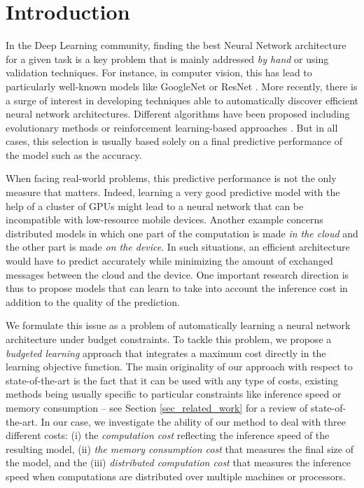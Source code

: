 \documentclass[10pt,twocolumn,letterpaper]{article}
\begin{document}
\section{Introduction}

In the Deep Learning community, finding the best Neural Network architecture for a given task is a key problem that is mainly addressed \textit{by hand} or using validation techniques. For instance, in computer vision, this has lead to particularly well-known models like GoogleNet \cite{DBLP:journals/corr/SzegedyLJSRAEVR14} or ResNet \cite{DBLP:journals/corr/HeZRS15}. More recently, there is a surge of interest in developing techniques able to automatically discover efficient neural network architectures. Different algorithms have been proposed including evolutionary methods \cite{DBLP:conf/gecco/StanleyM02a, DBLP:journals/corr/MiikkulainenLMR17, DBLP:journals/corr/RealMSSSLK17} or reinforcement learning-based approaches \cite{DBLP:journals/corr/ZophL16}. But in all cases, this selection is usually based solely on a final predictive performance of the model such as the accuracy. 

When facing real-world problems, this predictive performance is not the only measure that matters. Indeed, learning a very good predictive model with the help of a cluster of GPUs might lead to a neural network that can be incompatible with low-resource mobile devices. Another example concerns distributed models in which one part of the computation is made \textit{in the cloud} and the other part is made \textit{on the device}. In such situations, an efficient architecture would have to predict accurately while minimizing the amount of exchanged messages between the cloud and the device. One important research direction is thus to propose models that can learn to take into account the inference cost in addition to the quality of the prediction. 

We formulate this issue as a problem of automatically learning a neural network architecture under budget constraints. To tackle this problem, we propose a \textit{budgeted learning} approach that integrates a maximum cost directly in the learning objective function. The main originality of our approach with respect to state-of-the-art is the fact that it can be used with any type of costs, existing methods being usually specific to particular constraints like inference speed or memory consumption -- see Section \ref{sec_related_work} for a review of state-of-the-art. In our case, we investigate the ability of our method to deal with three different costs: (i) the \textit{computation cost} reflecting the inference speed of the resulting model, (ii) \textit{the memory consumption cost} that measures the final size of the model, and the (iii) \textit{distributed computation cost} that measures the inference speed when computations are distributed over multiple machines or processors. 
\end{document}
